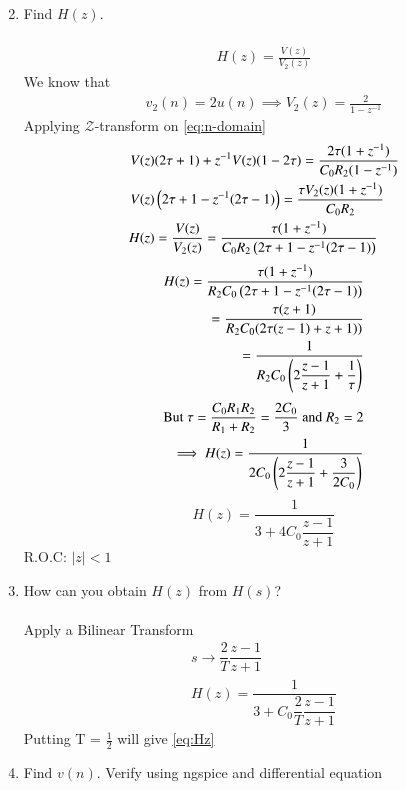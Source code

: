\documentclass[journal,12pt,twocolumn]{IEEEtran}
\renewcommand\thesection{\arabic{section}}
\begin{document}
\begin{enumerate}[label=\arabic*.,ref=\thesection.\theenumi]
\begin{align}
	\label{eq:n-domain}
\end{align}
\item Find $H(z)$.\\
\solution\\
\begin{align}
	H(z) = \frac{V(z)}{V_2(z)}
\end{align}
We know that 
\begin{align}
	v_2(n) = 2u(n) \implies V_2(z) = \frac{2}{1-z^{-1}}
\end{align}
Applying $\mathcal{Z}$-transform on \eqref{eq:n-domain}
\begin{align}
	V(z)&(2\tau + 1) + z^{-1}V(z)(1 - 2\tau) = \frac{2\tau(1 + z^{-1})}{C_0R_2(1 - z^{-1})}\\
	V(z)&\left(2\tau + 1 -z^{-1}(2\tau - 1)\right) = \frac{\tau V_2(z)(1 + z^{-1})}{C_0R_2}\\
	H(z)& = \frac{V(z)}{V_2(z)} = \frac{\tau(1 + z^{-1})}{C_0R_2\left(2\tau + 1 -z^{-1}(2\tau - 1)\right)}
\end{align}
\begin{align}
	H(z) = \frac{\tau(1 + z^{-1})}{R_2C_0\left(2\tau + 1 -z^{-1}(2\tau - 1)\right)}\\
	= \frac{\tau (z + 1)}{R_2C_0(2\tau(z-1) + z + 1))}\\
	= \dfrac{1}{R_2C_0\left(2\dfrac{z - 1}{z + 1} + \dfrac{1}{\tau}\right)}
\end{align}
\begin{align}
	\text{But }\tau = \frac{C_0R_1R_2}{R_1 + R_2} = \frac{2C_0}{3} \text{ and } R_2 = 2 \nonumber\\
	\implies H(z) = \dfrac{1}{2C_0\left(2\dfrac{z - 1}{z + 1} + \dfrac{3}{2C_0}\right)}
\end{align}
\begin{equation}
	H(z) = \dfrac{1}{3 + 4C_0\dfrac{z-1}{z+1}}
	\label{eq:Hz}
\end{equation}
R.O.C: $|z| < 1$
\item How can you obtain $H(z)$ from $H(s)$?\\
\solution\\
Apply a Bilinear Transform
\begin{align}
	s \rightarrow \dfrac{2}{T}\dfrac{z-1}{z+1}\\
	H(z) = \dfrac{1}{3 + C_0\dfrac{2}{T}\dfrac{z-1}{z+1}}
\end{align}
Putting T = $\frac{1}{2}$ will give \eqref{eq:Hz}\\
\item Find $v(n)$. Verify using ngspice and differential equation\\

\end{enumerate}
\end{document}

